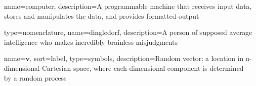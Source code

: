 
{
name=computer,
description={A programmable machine that receives input data,
               stores and manipulates the data, and provides
               formatted output}
}


{
type=nomenclature,
name=dingledorf,
description={A person of supposed average intelligence who makes incredibly brainless misjudgments}
}





{
name={$\mathbf{v}$},
sort={label},
type=symbols,
description={Random vector: a location in n-dimensional Cartesian space, where each dimensional component is determined by a random process}
}
 
\makeglossaries